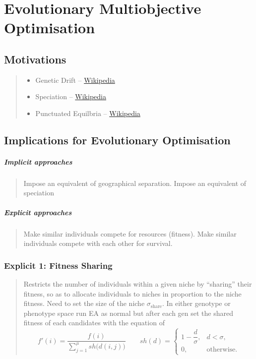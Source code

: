 \documentclass[a4paper, 11pt]{report}
\theoremstyle{remark}
\begin{document}
\chapter{Evolutionary Multiobjective Optimisation}
\section{Motivations}
    \begin{quote}
        \begin{itemize}
            \item Genetic Drift -- \href{https://en.wikipedia.org/wiki/Genetic_drift}{Wikipedia}
            \item Speciation -- \href{https://en.wikipedia.org/wiki/Speciation}{Wikipedia}
            \item Punctuated Equilbria -- \href{https://en.wikipedia.org/wiki/Punctuated_equilibrium}{Wikipedia}
        \end{itemize}
    \end{quote}
\section{Implications for Evolutionary Optimisation}
\paragraph{Implicit approaches}
    \begin{quote}
        Impose an equivalent of geographical separation. Impose an equivalent of speciation
    \end{quote}
\paragraph{Explicit approaches}
    \begin{quote}
        Make similar individuals compete for resources (fitness). Make similar individuals compete with each other for survival.
    \end{quote}
\subsection{Explicit 1: Fitness Sharing}
    \begin{quote}
        Restricts the number of individuals within a given niche by ``sharing'' their fitness, so as to allocate individuals to niches in proportion to the 
        niche fitness. Need to set the size of the niche $\sigma_{\text{share}}$. In either genotype or phenotype space run EA as normal but after each gen 
        set the shared fitness of each candidates with the equation of
        \begin{equation*}
            f'(i) = \frac{f(i)}{\displaystyle\sum_{j=1}^{\mu} sh\bigl(d(i,j)\bigr)}
            \qquad sh(d) =
            \begin{cases}
                1 - \dfrac{d}{\sigma}, & d < \sigma,\\[6pt]
                0, & \text{otherwise.}
            \end{cases} 
        \end{equation*}
    \end{quote}
\end{document}
